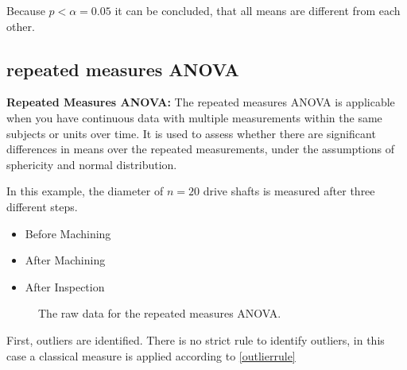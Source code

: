 \documentclass[
  a4paper,
]{scrbook}
\providecommand{\tightlist}{%
  \setlength{\itemsep}{0pt}\setlength{\parskip}{0pt}}\usepackage{longtable,booktabs,array}
\begin{document}
Because \(p<\alpha = 0.05\) it can be concluded, that all means are
different from each other.

\subsection{repeated measures ANOVA}\label{repeated-measures-anova}

\textbf{Repeated Measures ANOVA:} The repeated measures ANOVA is
applicable when you have continuous data with multiple measurements
within the same subjects or units over time. It is used to assess
whether there are significant differences in means over the repeated
measurements, under the assumptions of sphericity and normal
distribution.

In this example, the diameter of \(n = 20\) drive shafts is measured
after three different steps.

\begin{itemize}
\tightlist
\item
  Before Machining
\item
  After Machining
\item
  After Inspection
\end{itemize}

\begin{figure}[H]


\caption{\label{fig-rep-meas-raw}The raw data for the repeated measures
ANOVA.}

\end{figure}%

First, outliers are identified. There is no strict rule to identify
outliers, in this case a classical measure is applied according to
\eqref{outlierrule}
\end{document}
